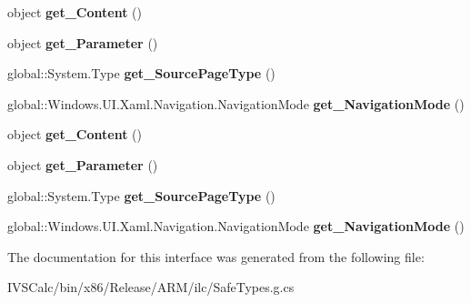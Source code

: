 \begin{DoxyCompactItemize}
\mbox{\label{interface_windows_1_1_u_i_1_1_xaml_1_1_navigation_1_1_i_navigation_event_args_a3c11816e887751b9b6b55f442d6a56fb}} 
object {\bfseries get\+\_\+\+Content} ()
\item 
\mbox{\label{interface_windows_1_1_u_i_1_1_xaml_1_1_navigation_1_1_i_navigation_event_args_aee2399db790c7ded1a3d517b16cf1565}} 
object {\bfseries get\+\_\+\+Parameter} ()
\item 
\mbox{\label{interface_windows_1_1_u_i_1_1_xaml_1_1_navigation_1_1_i_navigation_event_args_ac9be56f9222f1792a7cfaec765f29028}} 
global\+::\+System.\+Type {\bfseries get\+\_\+\+Source\+Page\+Type} ()
\item 
\mbox{\label{interface_windows_1_1_u_i_1_1_xaml_1_1_navigation_1_1_i_navigation_event_args_afd6b094e858b9b03320c2320a9b27f6c}} 
global\+::\+Windows.\+U\+I.\+Xaml.\+Navigation.\+Navigation\+Mode {\bfseries get\+\_\+\+Navigation\+Mode} ()
\item 
\mbox{\label{interface_windows_1_1_u_i_1_1_xaml_1_1_navigation_1_1_i_navigation_event_args_a3c11816e887751b9b6b55f442d6a56fb}} 
object {\bfseries get\+\_\+\+Content} ()
\item 
\mbox{\label{interface_windows_1_1_u_i_1_1_xaml_1_1_navigation_1_1_i_navigation_event_args_aee2399db790c7ded1a3d517b16cf1565}} 
object {\bfseries get\+\_\+\+Parameter} ()
\item 
\mbox{\label{interface_windows_1_1_u_i_1_1_xaml_1_1_navigation_1_1_i_navigation_event_args_ac9be56f9222f1792a7cfaec765f29028}} 
global\+::\+System.\+Type {\bfseries get\+\_\+\+Source\+Page\+Type} ()
\item 
\mbox{\label{interface_windows_1_1_u_i_1_1_xaml_1_1_navigation_1_1_i_navigation_event_args_afd6b094e858b9b03320c2320a9b27f6c}} 
global\+::\+Windows.\+U\+I.\+Xaml.\+Navigation.\+Navigation\+Mode {\bfseries get\+\_\+\+Navigation\+Mode} ()
\end{DoxyCompactItemize}


The documentation for this interface was generated from the following file\+:\begin{DoxyCompactItemize}
\item 
I\+V\+S\+Calc/bin/x86/\+Release/\+A\+R\+M/ilc/Safe\+Types.\+g.\+cs\end{DoxyCompactItemize}
